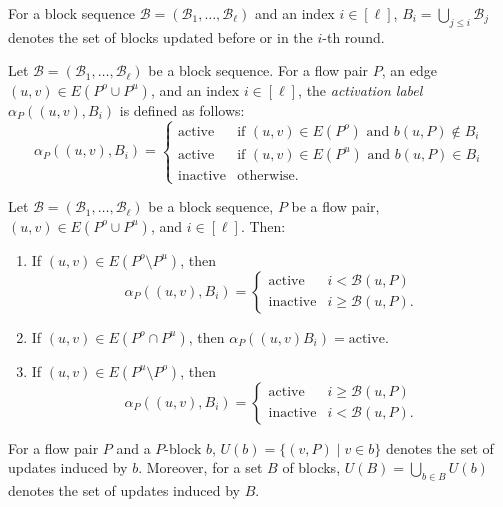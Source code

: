 \documentclass[fontsize=11pt,paper=a4]{book}
\begin{document}
\begin{notation}
For a block sequence \(\mathcal{B}=(\mathscr{B}_1,\dots,\mathscr{B}_{\ell})\) and an index \(i\in[\ell]\), \(B_i=\bigcup_{j\leq i}\mathscr{B}_j\) denotes the set of blocks updated before or in the \(i\)-th round.
\label{org94a692e}
\end{notation}

\begin{defn}
Let \(\mathcal{B}=(\mathscr{B}_1,\dots,\mathscr{B}_{\ell})\) be a block sequence.
For a flow pair \(P\), an edge \((u,v)\in E(P^o\cup P^u)\), and an index \(i\in[\ell]\), the \emph{activation label} \(\alpha_P((u,v),B_i)\) is defined as follows:
\[\alpha_P((u,v),B_i)=
\begin{cases}
\mathrm{active} & \text{if }(u,v)\in E(P^o)\text{ and }b(u,P)\notin B_i\\
\mathrm{active} & \text{if }(u,v)\in E(P^u)\text{ and }b(u,P)\in B_i\\
\mathrm{inactive} & \text{otherwise}.
\end{cases}\]
\label{orgb7d6f62}
\end{defn}

\begin{lem}
Let \(\mathcal{B}=(\mathscr{B}_1,\dots,\mathscr{B}_{\ell})\) be a block sequence, \(P\) be a flow pair, \((u,v)\in E(P^o\cup P^u)\), and \(i\in[\ell]\).
Then:

\begin{enumerate}
\item If \((u,v)\in E(P^o\setminus P^u)\), then
\[\alpha_P((u,v),B_i)=
   \begin{cases}
   \mathrm{active} & i<\mathcal{B}(u,P)\\
   \mathrm{inactive} & i\geq\mathcal{B}(u,P).
   \end{cases}\]

\item If \((u,v)\in E(P^o\cap P^u)\), then \(\alpha_P((u,v)B_i)=\mathrm{active}\).

\item If \((u,v)\in E(P^u\setminus P^o)\), then
\[\alpha_P((u,v),B_i)=
   \begin{cases}
   \mathrm{active} & i\geq\mathcal{B}(u,P)\\
   \mathrm{inactive} & i<\mathcal{B}(u,P).
   \end{cases}\]
\end{enumerate}
\label{org64ed0a0}
\end{lem}

\begin{notation}
For a flow pair \(P\) and a \(P\)-block \(b\), \(U(b)=\{(v,P)\mid v\in b\}\) denotes the set of updates induced by \(b\).
Moreover, for a set \(B\) of blocks, \(U(B)=\bigcup_{b\in B}U(b)\) denotes the set of updates induced by \(B\).
\label{org407cba5}
\end{notation}
\end{document}
